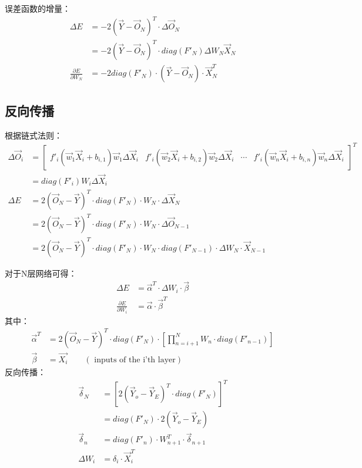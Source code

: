 \documentclass{article}
\begin{document}
误差函数的增量：
\begin{align*}
\Delta E &=-2(\vec Y-\vec O_N)^T\cdot \Delta\vec O_N\\
&=-2(\vec Y-\vec O_N)^T\cdot diag(F'_N)\Delta W_N \vec X_N\\
\frac{\partial E}{\partial W_N}&=-2 diag(F'_N)\cdot(\vec Y-\vec O_N)\cdot \vec X_N^T
\end{align*}

\subsection{反向传播}
根据链式法则：
\begin{align*}
\Delta \vec O_i&=\begin{bmatrix}
f'_i(\vec w_1 \vec X_i+b_{i,1}) \vec w_1 \Delta\vec X_i  &  f'_i(\vec w_2 \vec X_i+b_{i,2}) \vec w_2 \Delta\vec X_i & \cdots & f'_i(\vec w_n \vec X_i +b_{i,n}) \vec w_n \Delta\vec X_i
\end{bmatrix}^T \\
&=diag(F'_i)W_i \Delta\vec X_i\\
\Delta E &= 2(\vec O_N-\vec Y)^T\cdot diag(F'_N) \cdot W_N \cdot \Delta \vec X_N\\
&= 2(\vec O_N-\vec Y)^T\cdot diag(F'_N) \cdot W_N \cdot \Delta \vec O_{N-1}\\
&=2(\vec O_N-\vec Y)^T\cdot diag(F'_N) \cdot W_N \cdot diag(F'_{N-1})\cdot \Delta W_N \cdot \vec X_{N-1}
\end{align*}

对于N层网络可得：
\begin{align*}
\Delta E &= \vec{\alpha}^T\cdot\Delta W_i\cdot \vec{\beta} \\
\frac{\partial E}{\partial W_i} &= \vec{\alpha}\cdot\vec \beta^T
\end{align*}
其中：
\begin{align*}
\vec{\alpha}^T&=2(\vec O_N-\vec Y)^T\cdot diag(F'_N) \cdot \left[\prod_{n=i+1}^{N} W_n \cdot diag(F'_{n-1})\right] \\
\vec{\beta}&=\vec{X_i}\qquad (\text{ inputs of the i'th layer})
\end{align*}
反向传播：
\begin{align*}
\vec\delta_N&=[2(\vec Y_o-\vec Y_E)^T\cdot diag(F'_N)]^T \\
            &= diag(F'_N)\cdot 2(\vec Y_o-\vec Y_E) \\
\vec\delta_n&=  diag(F'_n)\cdot W_{n+1}^T \cdot\vec\delta_{n+1} \\
\Delta W_i &=\delta_i \cdot \vec X_i^T
\end{align*}
\end{document}
